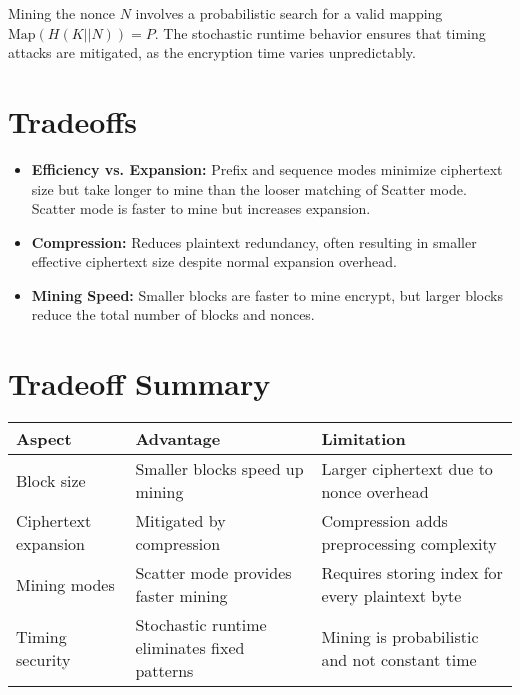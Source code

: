 \documentclass[11pt,a4paper]{article}
\begin{document}
Mining the nonce \( N \) involves a probabilistic search for a valid mapping \( \text{Map}(H(K || N)) = P \). The stochastic runtime behavior ensures that timing attacks are mitigated, as the encryption time varies unpredictably.

\section*{Tradeoffs}

\begin{itemize}
  \item \textbf{Efficiency vs. Expansion:} Prefix and sequence modes minimize ciphertext size but take longer to mine than the looser matching of Scatter mode. Scatter mode is faster to mine but increases expansion.
  \item \textbf{Compression:} Reduces plaintext redundancy, often resulting in smaller effective ciphertext size despite normal expansion overhead.
  \item \textbf{Mining Speed:} Smaller blocks are faster to mine encrypt, but larger blocks reduce the total number of blocks and nonces.
\end{itemize}

\section*{Tradeoff Summary}

\begin{center}
\begin{tabular}{@{}lll@{}}
\toprule
\textbf{Aspect}          & \textbf{Advantage}                                 & \textbf{Limitation}                          \\ \midrule
Block size               & Smaller blocks speed up mining                     & Larger ciphertext due to nonce overhead      \\
Ciphertext expansion     & Mitigated by compression                           & Compression adds preprocessing complexity    \\
Mining modes             & Scatter mode provides faster mining               & Requires storing index for every plaintext byte \\
Timing security          & Stochastic runtime eliminates fixed patterns       & Mining is probabilistic and not constant time \\
\bottomrule
\end{tabular}
\end{center}
\end{document}
